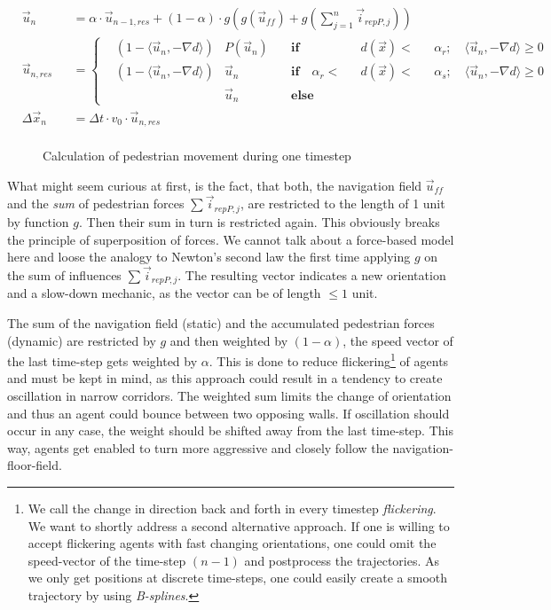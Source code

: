 \begin{align*}
&\vec{u}_{n}&&= \alpha\cdot\vec{u}_{n-1, res} + (1 - \alpha)\cdot g\left(g(\vec{u}_{ff})+g(\sum_{j=1}^n\vec{i}_{repP,j})\right)\\
&\vec{u}_{n, res}&&= \left\{
	\begin{aligned}
        &\left(1-\langle\vec{u}_{n},-\nabla d\rangle\right)  & P(\vec{u}_{n}) \quad & \textbf{if} \quad  && d(\vec{x}) < && \alpha_{r}; \quad \langle\vec{u}_{n},-\nabla d\rangle \ge 0 \\
        &\left(1-\langle\vec{u}_{n},-\nabla d\rangle\right)  & \vec{u}_{n} \quad  & \textbf{if} \quad \alpha_{r} <   && d(\vec{x}) < && \alpha_{s} ;\quad \langle\vec{u}_{n},-\nabla d\rangle \ge 0\\
		& &\vec{u}_{n} \quad & \textbf{else} &&   &&%
	\end{aligned}
	\right.\\
&\Delta\vec{x}_{n}&&= \Delta t \cdot v_0 \cdot\vec{u}_{n, res}\\
\end{align*}
\newpage
%
\begin{figure}[h!]

%
\caption{Calculation of pedestrian movement during one timestep}
\end{figure}
\newpage

What might seem curious at first, is the fact, that both, the navigation field $\vec{u}_{ff}$ and the \emph{sum} of pedestrian forces $\sum\vec{i}_{repP,j} $, are restricted to the length of 1 unit by function $g$. Then their sum in turn is restricted again. This obviously breaks the principle of superposition of forces. We cannot talk about a force-based model here and loose the analogy to Newton's second law the first time applying $g$ on the sum of influences $\sum\vec{i}_{repP,j}$. The resulting vector indicates a new orientation and a slow-down mechanic, as the vector can be of length $ \leq 1 $ unit.

The sum of the navigation field (static) and the accumulated pedestrian forces (dynamic) are restricted by $g$ and then weighted by $(1-\alpha)$, the speed vector of the last time-step gets weighted by $\alpha$. This is done to reduce flickering\footnote{We call the change in direction back and forth in every timestep \emph{flickering}. We want to shortly address a second alternative approach. If one is willing to accept flickering agents with fast changing orientations, one could omit the speed-vector of the time-step $(n-1)$ and postprocess the trajectories. As we only get positions at discrete time-steps, one could easily create a smooth trajectory by using \emph{B-splines}.} of agents and must be kept in mind, as this approach could result in a tendency to create oscillation in narrow corridors. The weighted sum limits the change of orientation and thus an agent could bounce between two opposing walls.  If oscillation should occur in any case, the weight should be shifted away from the last time-step. This way, agents get enabled to turn more aggressive and closely follow the navigation-floor-field.

